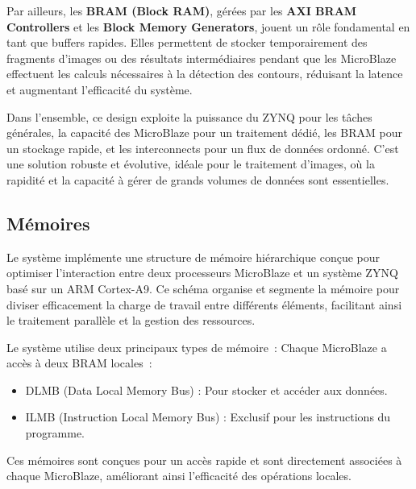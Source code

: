 \documentclass[../CSC_5RO07_TA.tex]{subfiles}
\begin{document}
\vspace{1em} 

Par ailleurs, les \textbf{BRAM (Block RAM)}, gérées par les \textbf{AXI BRAM Controllers} et les \textbf{Block Memory Generators}, jouent un rôle fondamental en tant que buffers rapides. Elles permettent de stocker temporairement des fragments d’images ou des résultats intermédiaires pendant que les MicroBlaze effectuent les calculs nécessaires à la détection des contours, réduisant la latence et augmentant l'efficacité du système.

\vspace{1em} 

Dans l’ensemble, ce design exploite la puissance du ZYNQ pour les tâches générales, la capacité des MicroBlaze pour un traitement dédié, les BRAM pour un stockage rapide, et les interconnects pour un flux de données ordonné. C’est une solution robuste et évolutive, idéale pour le traitement d’images, où la rapidité et la capacité à gérer de grands volumes de données sont essentielles.

\subsection{Mémoires}
Le système implémente une structure de mémoire hiérarchique conçue pour optimiser l'interaction entre deux processeurs MicroBlaze et un système ZYNQ basé sur un ARM Cortex-A9. Ce schéma organise et segmente la mémoire pour diviser efficacement la charge de travail entre différents éléments, facilitant ainsi le traitement parallèle et la gestion des ressources.
\vspace{1em} 

Le système utilise deux principaux types de mémoire :
Chaque MicroBlaze a accès à deux BRAM locales :
\begin{itemize}
    \item DLMB (Data Local Memory Bus) : Pour stocker et accéder aux données.
    \item ILMB (Instruction Local Memory Bus) : Exclusif pour les instructions du programme.
 \end{itemize}
 Ces mémoires sont conçues pour un accès rapide et sont directement associées à chaque MicroBlaze, améliorant ainsi l'efficacité des opérations locales.
\end{document}
